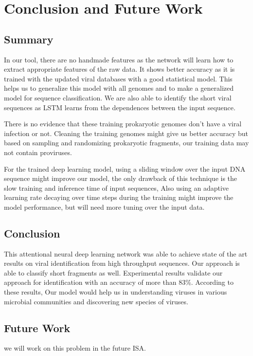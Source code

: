 
\chapter{Conclusion and Future Work} %

\label{Chapter5	} %



\section{Summary}

In our tool, there are no handmade features as the network will learn how to extract appropriate features of the raw data. It shows better accuracy as it is trained with the updated viral databases with a good statistical model. This helps us to generalize this model with all genomes and to make a generalized model for sequence classification. We are also able to identify the short viral sequences as LSTM learns from the dependences between the input sequence. 

There is no evidence that these training prokaryotic genomes don't have a viral infection or not. Cleaning the training genomes might give us better accuracy but based on sampling and randomizing prokaryotic fragments, our training data may not contain proviruses. 

For the trained deep learning model, using a sliding window over the input DNA sequence might improve our model, the only drawback of this technique is the slow training and inference time of input sequences, Also using an adaptive learning rate decaying over time steps during the training might improve the model performance, but will need more tuning over the input data.

\section{Conclusion}

This attentional neural deep learning network was able to achieve state of the art results on viral identification from high throughput sequences. Our approach is able to classify short fragments as well. Experimental results validate our approach for identification with an accuracy of more than 83\%. According to these results, Our model would help us in understanding viruses in various microbial communities and discovering new species of viruses.

\section{Future Work}


we will work on this problem in the future ISA. 